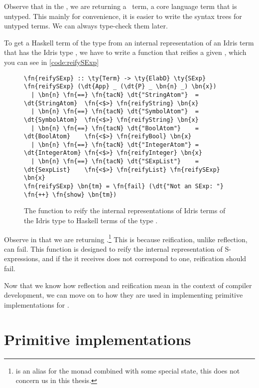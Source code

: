 Observe that in the , we are returning a \Raw\ term, a core
language term that is untyped. This mainly for convenience, it is easier to
write the syntax trees for untyped terms. We can always type-check them later.

To get a Haskell term of the type  from an internal representation of
an Idris term that has the Idris type , we have to write a function
 that reifies a given , which you can see in
\autoref{code:reifySExp}

\begin{figure}[ht]
\caption{The function to reify the internal representations of Idris terms
  of the Idris type  to Haskell terms of the type .}
\label{code:reifySExp}
\begin{Verbatim}[framesep=2mm, label=\footnotesize{\normalfont{Haskell}}, labelposition=topline]
\fn{reifySExp} :: \ty{Term} -> \ty{ElabD} \ty{SExp}
\fn{reifySExp} (\dt{App} _ (\dt{P} _ \bn{n} _) \bn{x})
  | \bn{n} \fn{==} \fn{tacN} \dt{"StringAtom"}  = \dt{StringAtom}  \fn{<$>} \fn{reifyString} \bn{x}
  | \bn{n} \fn{==} \fn{tacN} \dt{"SymbolAtom"}  = \dt{SymbolAtom}  \fn{<$>} \fn{reifyString} \bn{x}
  | \bn{n} \fn{==} \fn{tacN} \dt{"BoolAtom"}    = \dt{BoolAtom}    \fn{<$>} \fn{reifyBool} \bn{x}
  | \bn{n} \fn{==} \fn{tacN} \dt{"IntegerAtom"} = \dt{IntegerAtom} \fn{<$>} \fn{reifyInteger} \bn{x}
  | \bn{n} \fn{==} \fn{tacN} \dt{"SExpList"}    = \dt{SexpList}    \fn{<$>} \fn{reifyList} \fn{reifySExp} \bn{x}
\fn{reifySExp} \bn{tm} = \fn{fail} (\dt{"Not an SExp: "} \fn{++} \fn{show} \bn{tm})
\end{Verbatim}
\end{figure}

Observe in  that we are returning
.\footnote{ is an alias for the  monad
combined with some special state, this does not concern us in this thesis.}
This is because reification, unlike reflection, can fail. This function is
designed to reify the internal representation of S-expressions, and if the
 it receives does not correspond to one, reification should fail.

Now that we know how reflection and reification mean in the context of compiler
development, we can move on to how they are used in implementing primitive
implementations for .

\section{Primitive  implementations}\label{sec:primitiveEditorableImpl}

